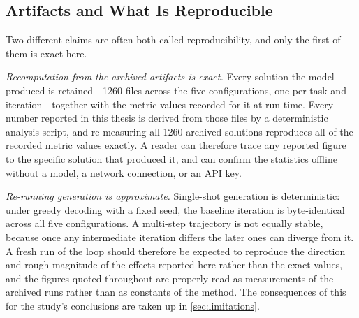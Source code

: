 \subsection{Artifacts and What Is Reproducible}
\label{sec:artifacts}
Two different claims are often both called reproducibility, and only the first of
them is exact here.

\emph{Recomputation from the archived artifacts is exact.} Every solution the model
produced is retained---1260 files across the five configurations, one per task and
iteration---together with the metric values recorded for it at run time. Every
number reported in this thesis is derived from those files by a deterministic
analysis script, and re-measuring all 1260 archived solutions reproduces all of the
recorded metric values exactly. A reader can therefore trace any reported figure to
the specific solution that produced it, and can confirm the statistics offline
without a model, a network connection, or an API key.

\emph{Re-running generation is approximate.} Single-shot generation is
deterministic: under greedy decoding with a fixed seed, the baseline iteration is
byte-identical across all five configurations. A multi-step trajectory is not
equally stable, because once any intermediate iteration differs the later ones can
diverge from it. A fresh run of the loop should therefore be expected to reproduce
the direction and rough magnitude of the effects reported here rather than the exact
values, and the figures quoted throughout are properly read as measurements of the
archived runs rather than as constants of the method. The consequences of this for
the study's conclusions are taken up in \cref{sec:limitations}.
